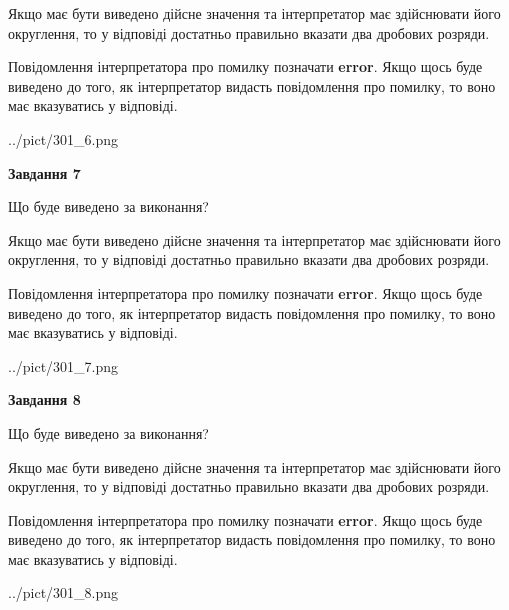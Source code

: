 \documentclass[12pt, ukrainian]{article}
\begin{document}
{\begin {Large}
Якщо має бути виведено дійсне значення та інтерпретатор має здійснювати його округлення, 
то у відповіді достатньо правильно вказати два дробових розряди.

Повідомлення інтерпретатора про помилку позначати \textbf{error}.
Якщо щось буде виведено до того, як інтерпретатор видасть повідомлення про помилку, 
то воно має вказуватись у відповіді. \par

\begin{center}
	{../pict/301_6.png}
\end{center}
\newpage

{\begin {center}\textbf{Завдання 7}\end {center}}\par
Що буде виведено за виконання? \par

Якщо має бути виведено дійсне значення та інтерпретатор має здійснювати його округлення, 
то у відповіді достатньо правильно вказати два дробових розряди.

Повідомлення інтерпретатора про помилку позначати \textbf{error}.
Якщо щось буде виведено до того, як інтерпретатор видасть повідомлення про помилку, 
то воно має вказуватись у відповіді. \par

\begin{center}
	{../pict/301_7.png}
\end{center}
\newpage

{\begin {center}\textbf{Завдання 8}\end {center}}\par
Що буде виведено за виконання? \par

Якщо має бути виведено дійсне значення та інтерпретатор має здійснювати його округлення, 
то у відповіді достатньо правильно вказати два дробових розряди.

Повідомлення інтерпретатора про помилку позначати \textbf{error}.
Якщо щось буде виведено до того, як інтерпретатор видасть повідомлення про помилку, 
то воно має вказуватись у відповіді. \par

\begin{center}
	{../pict/301_8.png}
\end{center}
\newpage


\end{Large}}
\end{document}

